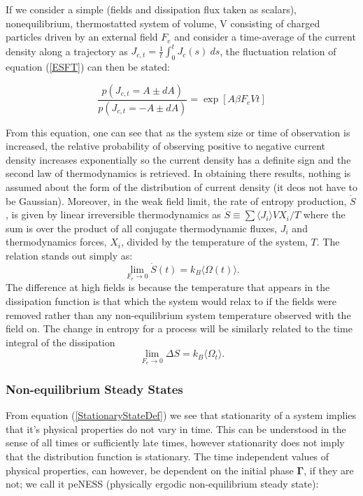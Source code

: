 \documentclass[a4paper,12pt]{article}
\begin{document}
If we consider a simple (fields and dissipation flux taken as scalars), nonequilibrium, thermostatted system of volume, V consisting of charged particles driven by an external field $F_e$ and consider a time-average of the current density along a trajectory as $J_{c,t}= \frac{1}{t}\int_0^t J_c(s)\ ds$, the fluctuation relation of equation (\ref{ESFT}) can then be stated:

\begin{equation}
  \frac{p(J_{c,t}=A\pm dA)}{p(J_{c,t}=-A\pm dA)}= \exp[A \beta F_e V t]
\end{equation}

From this equation, one can see that as the system size or time of observation is increased, the relative probability of observing positive to negative current density increases exponentially so the current density has a definite sign and the second law of thermodynamics is retrieved. In obtaining there results, nothing is assumed about the form of the distribution of current density (it deos not have to be Gaussian). Moreover, in the weak field limit, the rate of entropy production, $\dot{S}$, is given by linear irreversible thermodynamics as $\dot{S} \equiv \sum \langle J_i \rangle V X_i/T$ where the sum is over the product of all conjugate thermodynamic fluxes, $J_i$ and thermodynamics forces, $X_i$, divided by the temperature of the system, $T$. The relation stands out simply as:
\begin{equation}
  \lim_{F_e \to 0} \dot{S}(t) = k_B \langle \Omega(t) \rangle.
\end{equation}
The difference at high fields is because the temperature that appears in the dissipation function is that which the system would relax to if the fields were removed rather than any non-equilibrium system temperature observed with the field on\cite{Evans:2241458}. The change in entropy for a process will be similarly related to the time integral of the dissipation
\begin{equation}
  \lim_{F_e \to 0} \Delta S= k_B \langle \Omega_t \rangle.
\end{equation}

\subsubsection{Non-equilibrium Steady States}

From equation (\ref{StationaryStateDef}) we see that stationarity of a system implies that it's physical properties do not vary in time. This can be understood in the sense of all times or sufficiently late times, however stationarity does not imply that the distribution function is stationary.
The time independent values of physical properties, can however, be dependent on the initial phase $\bm{\Gamma}$, if they are not; we call it peNESS (physically ergodic non-equilibrium steady state):
\end{document}
